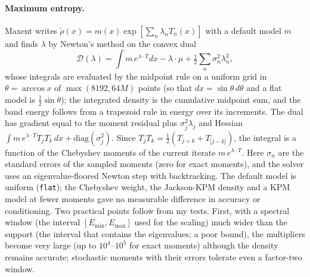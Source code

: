 \documentclass[reprint,nofootinbib,superscriptaddress,amsmath,amssymb,aps,prb,floatfix]{revtex4-2}
\begin{document}
\paragraph*{Maximum entropy.}
Maxent \cite{mead,turek,drabold1993,silver1997} writes $\tilde\rho(x)=m(x)\exp[\sum_n\lambda_nT_n(x)]$ with a default model $m$ and finds $\lambda$ by Newton's method on the convex dual
\begin{equation}
\mathcal D(\lambda)=\int m\,e^{\lambda\cdot T}dx-\lambda\cdot\mu+\tfrac12\sum_n\sigma_n^2\lambda_n^2 ,
\end{equation}
whose integrals are evaluated by the midpoint rule on a uniform grid in $\theta=\arccos x$ of $\max(8192,64M)$ points (so that $dx=\sin\theta\,d\theta$ and a flat model is $\tfrac12\sin\theta$); the integrated density is the cumulative midpoint sum, and the band energy follows from a trapezoid rule in energy over its increments. The dual has gradient equal to the moment residual plus $\sigma_j^2\lambda_j$ and Hessian $\int m\,e^{\lambda\cdot T}T_jT_k\,dx+\mathrm{diag}(\sigma_j^2)$. Since $T_jT_k=\tfrac12(T_{j+k}+T_{|j-k|})$, the integral is a function of the Chebyshev moments of the current iterate $m\,e^{\lambda\cdot T}$. Here $\sigma_n$ are the standard errors of the sampled moments (zero for exact moments), and the solver uses an eigenvalue-floored Newton step with backtracking.
The default model is uniform (\texttt{flat}); the Chebyshev weight, the Jackson-KPM density and a KPM model at fewer moments gave no measurable difference in accuracy or conditioning.
Two practical points follow from my tests.
First, with a spectral window (the interval $[E_{\min},E_{\max}]$ used for the scaling) much wider than the support (the interval that contains the eigenvalues; a poor bound), the multipliers become very large (up to $10^4$--$10^5$ for exact moments) although the density remains accurate; stochastic moments with their errors tolerate even a factor-two window.
\end{document}
